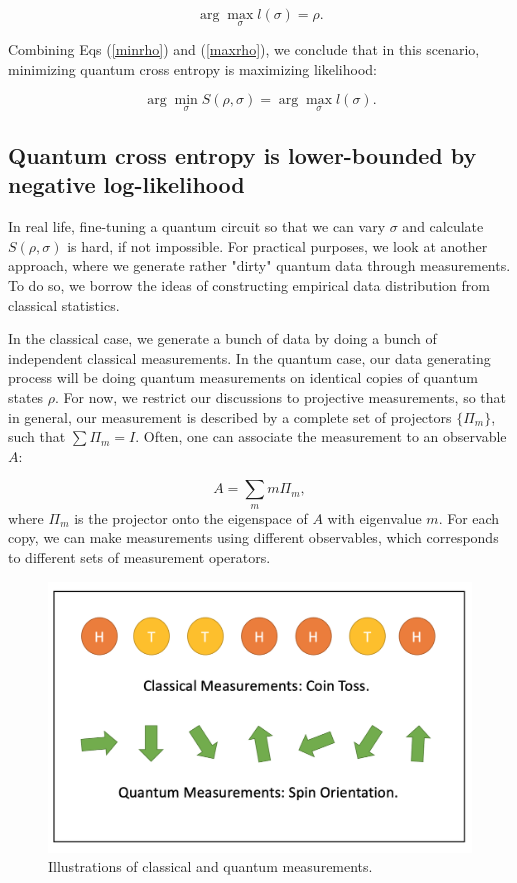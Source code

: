 \documentclass[11pt]{article}
\theoremstyle{definition}
\begin{document}
\begin{equation}\label{maxrho}
    \arg \max_{\sigma} l(\sigma) = \rho.
\end{equation}

Combining Eqs (\ref{minrho}) and (\ref{maxrho}), we conclude that in this scenario, minimizing quantum cross entropy is maximizing likelihood:

\begin{equation}
    \arg \min_{\sigma} S(\rho, \sigma) = \arg \max_{\sigma} l(\sigma).
\end{equation}



\subsection{Quantum cross entropy is lower-bounded by negative log-likelihood}

In real life, fine-tuning a quantum circuit so that we can vary $\sigma$ and calculate $S(\rho, \sigma)$ is hard, if not impossible. For practical purposes, we look at another approach, where we generate rather "dirty" quantum data through measurements. To do so, we borrow the ideas of constructing empirical data distribution from classical statistics.

In the classical case, we generate a bunch of data by doing a bunch of independent classical measurements. In the quantum case, our data generating process will be doing quantum measurements on identical copies of quantum states $\rho$. For now, we restrict our discussions to projective measurements, so that in general, our measurement is described by a complete set of projectors $\{\Pi_m\}$, such that $\sum \Pi_m = I$. Often, one can associate the measurement to an observable $A$:

\begin{equation}\label{measurement operator}
    A = \sum_m m \Pi_m,
\end{equation}
where $\Pi_m$ is the projector onto the eigenspace of $A$ with eigenvalue $m$.
For each copy, we can make measurements using different observables, which corresponds to different sets of measurement operators.

\begin{figure}[h]
\centering
\includegraphics[scale = 0.5]{ME.png}
\caption{Illustrations of classical and quantum measurements.}
\end{figure}
\end{document}
